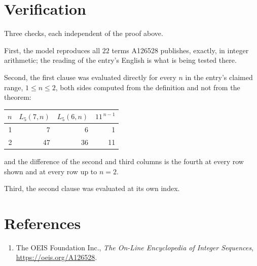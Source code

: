 \documentclass[11pt,a4paper]{article}
\theoremstyle{plain}
\theoremstyle{definition}
\begin{document}
\section{Verification}

Three checks, each independent of the proof above.

First, the model reproduces all $22$ terms A126528 publishes, exactly, in integer
arithmetic; the reading of the entry's English is what is being tested there.

Second, the first clause was evaluated directly for every $n$ in the entry's claimed range,
$1\le n\le2$, both sides computed from the definition and not from the theorem:

\begin{center}
\begin{tabular}{rrrr}
$n$ & $L_{5}(7,n)$ & $L_{5}(6,n)$ & $11^{\,n-1}$ \\ \hline
1 & 7 & 6 & 1 \\
2 & 47 & 36 & 11 \\
\end{tabular}
\end{center}

\noindent and the difference of the second and third columns is the fourth at every row shown
and at every row up to $n=2$.

Third, the second clause was evaluated at its own index.

\section*{References}
\begin{enumerate}
\item The OEIS Foundation Inc., \emph{The On-Line Encyclopedia of Integer Sequences},
\url{https://oeis.org/A126528}.
\end{enumerate}
\end{document}
